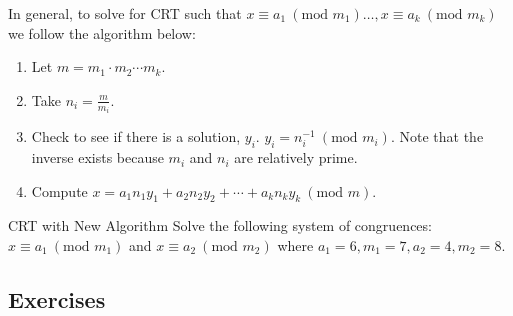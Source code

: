 \begin{note}
    In general, to solve for CRT such that \(x \equiv a_1 \ (\text{mod } m_1)\dots, x \equiv a_k \ (\text{mod } m_k)\) we follow the algorithm below:
    \begin{enumerate}
        \item Let \(m = m_1 \cdot m_2 \cdots m_k\).
        \item Take \(n_i = \frac{m}{m_i}\).
        \item  Check to see if there is a solution, \(y_i\). \(y_i = n_i^{-1} \ (\text{mod } m_i)\). Note that the inverse exists because \(m_i\) and \(n_i\) are relatively prime.
        \item Compute \(x = a_1n_1y_1 + a_2n_2y_2 + \cdots + a_kn_ky_k \ (\text{mod } m)\).
    \end{enumerate}
\end{note}
\newpage

\begin{example}
    {CRT with New Algorithm}
    Solve the following system of congruences: \(x \equiv a_1 \ (\text{mod } m_1)\) and \(x \equiv a_2 \ (\text{mod } m_2)\) where \(a_1 = 6, m_1 = 7, a_2 = 4, m_2 = 8\).
\end{example}


\renewcommand{\theenumi}{\alph{enumi}}
\renewcommand{\labelenumi}{(\theenumi)}
\subsection{Exercises}



